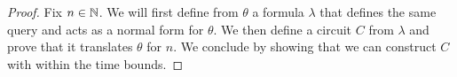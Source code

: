 \documentclass[../main/thesis.tex]{subfiles}
\begin{document}
\begin{proof}

  

  Fix $n \in \mathbb{N}$. We will first define from $\theta$ a formula $\lambda$ that
  defines the same query and acts as a normal form for $\theta$. We then define
  a circuit $C$ from $\lambda$ and prove that it translates $\theta$ for $n$. We
  conclude by showing that we can construct $C$ with within the time bounds.


\end{proof}
\end{document}
